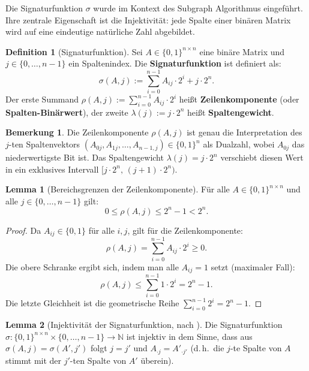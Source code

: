 ﻿\documentclass[a4paper,12pt]{scrreprt}
\theoremstyle{definition}
\newtheorem{definition}{Definition}[section]
\newtheorem{bemerkung}{Bemerkung}[section]
\newtheorem{lemma}{Lemma}[section]
\begin{document}
Die Signaturfunktion $\sigma$ wurde im Kontext des Subgraph Algorithmus \cite{Epp26a} eingeführt. Ihre zentrale Eigenschaft ist die Injektivität: jede Spalte einer binären Matrix wird auf eine eindeutige natürliche Zahl abgebildet.

\begin{definition}[Signaturfunktion]
	\label{def:sigma}
	Sei $A \in \{0,1\}^{n \times n}$ eine binäre Matrix und $j \in \{0,\ldots,n-1\}$ ein Spaltenindex. Die \textbf{Signaturfunktion} ist definiert als:
	\[
	\sigma(A, j) := \sum_{i=0}^{n-1} A_{ij} \cdot 2^i + j \cdot 2^n.
	\]
	Der erste Summand $\rho(A,j) := \sum_{i=0}^{n-1} A_{ij} \cdot 2^i$ heißt \textbf{Zeilenkomponente} (oder \textbf{Spalten-Binärwert}), der zweite $\lambda(j) := j \cdot 2^n$ heißt \textbf{Spaltengewicht}.
\end{definition}

\begin{bemerkung}
	Die Zeilenkomponente $\rho(A,j)$ ist genau die Interpretation des $j$-ten Spaltenvektors $(A_{0j}, A_{1j}, \ldots, A_{n-1,j}) \in \{0,1\}^n$ als Dualzahl, wobei $A_{0j}$ das niederwertigste Bit ist. Das Spaltengewicht $\lambda(j) = j \cdot 2^n$ verschiebt diesen Wert in ein exklusives Intervall $[j \cdot 2^n,\, (j+1) \cdot 2^n)$.
\end{bemerkung}

\begin{lemma}[Bereichsgrenzen der Zeilenkomponente]
	\label{lem:rho-bounds}
	Für alle $A \in \{0,1\}^{n \times n}$ und alle $j \in \{0,\ldots,n-1\}$ gilt:
	\[
	0 \leq \rho(A,j) \leq 2^n - 1 < 2^n.
	\]
\end{lemma}

\begin{proof}
	Da $A_{ij} \in \{0,1\}$ für alle $i, j$, gilt für die Zeilenkomponente:
	\[
	\rho(A,j) = \sum_{i=0}^{n-1} A_{ij} \cdot 2^i \geq 0.
	\]
	Die obere Schranke ergibt sich, indem man alle $A_{ij} = 1$ setzt (maximaler Fall):
	\[
	\rho(A,j) \leq \sum_{i=0}^{n-1} 1 \cdot 2^i = 2^n - 1.
	\]
	Die letzte Gleichheit ist die geometrische Reihe $\sum_{i=0}^{n-1} 2^i = 2^n - 1$.
\end{proof}

\begin{lemma}[Injektivität der Signaturfunktion, nach \cite{Epp26a}]
	\label{lem:inj}
	Die Signaturfunktion $\sigma: \{0,1\}^{n \times n} \times \{0,\ldots,n-1\} \to \mathbb{N}$ ist injektiv in dem Sinne, dass aus $\sigma(A,j) = \sigma(A',j')$ folgt $j = j'$ und $A_{\cdot j} = A'_{\cdot j'}$ (d.\,h.\ die $j$-te Spalte von $A$ stimmt mit der $j'$-ten Spalte von $A'$ überein).
\end{lemma}
\end{document}
